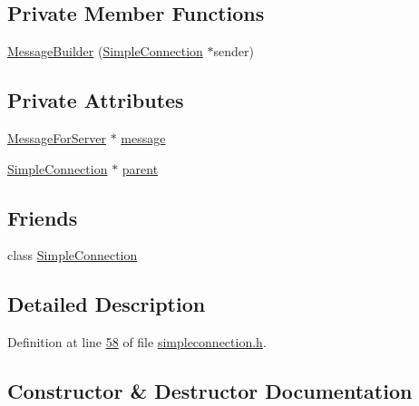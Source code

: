 \subsection*{Private Member Functions}
\begin{DoxyCompactItemize}
\item 
\hyperlink{a00129_a872f905bf802df170dc7d1e0e9e75105}{Message\+Builder} (\hyperlink{a00125}{Simple\+Connection} $\ast$sender)
\end{DoxyCompactItemize}
\subsection*{Private Attributes}
\begin{DoxyCompactItemize}
\item 
\hyperlink{a00121}{Message\+For\+Server} $\ast$ \hyperlink{a00129_a7a57d1afb561f7fe4b813e611c3269a7}{message}
\item 
\hyperlink{a00125}{Simple\+Connection} $\ast$ \hyperlink{a00129_a377817a44c6b088e5027365f8d6c8c8f}{parent}
\end{DoxyCompactItemize}
\subsection*{Friends}
\begin{DoxyCompactItemize}
\item 
class \hyperlink{a00129_a7539cf9ee12d3fa81d3d8702d8646c89}{Simple\+Connection}
\end{DoxyCompactItemize}


\subsection{Detailed Description}


Definition at line \hyperlink{a00008_source_l00058}{58} of file \hyperlink{a00008_source}{simpleconnection.\+h}.



\subsection{Constructor \& Destructor Documentation}
\mbox{\label{a00129_a872f905bf802df170dc7d1e0e9e75105}} 
